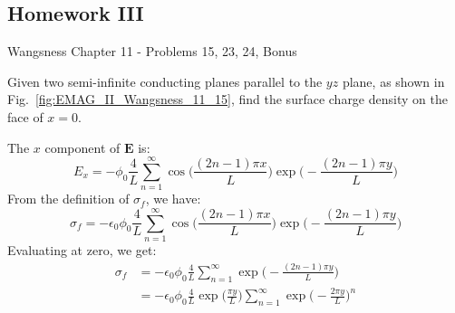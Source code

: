             \subsection{Homework III}
                Wangsness Chapter 11 - Problems 15, 23, 24, Bonus
                \begin{problem}
                    \label{problem:EMAG_II_Wangsness_11_15}
                    Given two semi-infinite conducting planes parallel
                    to the $yz$ plane, as shown in
                    Fig.~\ref{fig:EMAG_II_Wangsness_11_15},
                    find the surface charge density on the face of $x=0$.
                \end{problem}
                \begin{solution}
                    The $x$ component of $\mathbf{E}$ is:
                    \begin{equation}
                        E_{x}=\minus\phi_{0}\frac{4}{L}
                            \sum_{n=1}^{\infty}
                            \cos\Big(\frac{(2n-1)\pi{x}}{L}\Big)
                            \exp\Big(\minus\frac{(2n-1)\pi{y}}{L}\Big)
                    \end{equation}
                    From the definition of $\sigma_{f}$, we have:
                    \begin{equation}
                        \sigma_{f}=\minus\epsilon_{0}\phi_{0}\frac{4}{L}
                            \sum_{n=1}^{\infty}
                            \cos\Big(\frac{(2n-1)\pi{x}}{L}\Big)
                            \exp\Big(\minus\frac{(2n-1)\pi{y}}{L}\Big)
                    \end{equation}
                    Evaluating at zero, we get:
                    \begin{subequations}
                        \begin{align}
                            \sigma_{f}&=\minus\epsilon_{0}
                                \phi_{0}\frac{4}{L}\sum_{n=1}^{\infty}
                                \exp\Big(
                                    \minus\frac{(2n-1)\pi{y}}{L}
                                \Big)\\
                                &=\minus\epsilon_{0}\phi_{0}\frac{4}{L}
                                \exp\big(\frac{\pi{y}}{L}\big)
                                \sum_{n=1}^{\infty}
                                \exp\Big(\minus\frac{2\pi{y}}{L}\Big)^{n}
                        \end{align}
                    \end{subequations}

\end{solution}
